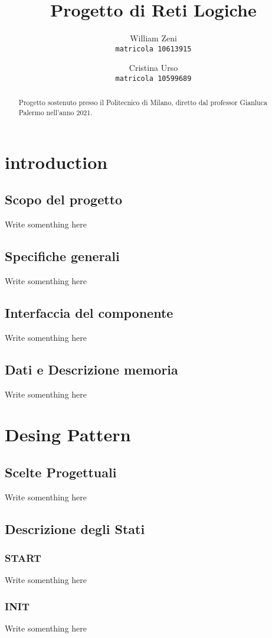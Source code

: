 \documentclass{article}
\title{Progetto di Reti Logiche}
\author{
  William Zeni\\
  \texttt{matricola 10613915}
  \and
  Cristina Urso\\
  \texttt{matricola 10599689}
}
\begin{document}
\maketitle

\begin{abstract}
  \centering
  Progetto sostenuto presso il Politecnico di Milano, diretto dal professor Gianluca Palermo nell'anno 2021.
\end{abstract}

\section{introduction}
\subsection{Scopo del progetto}
Write somenthing here

\subsection{Specifiche generali}
Write somenthing here

\subsection{Interfaccia del componente}
Write somenthing here

\subsection{Dati e Descrizione memoria}
Write somenthing here

\section{Desing Pattern}
\subsection{Scelte Progettuali}
Write somenthing here

\subsection{Descrizione degli Stati}
\subsubsection{START}
Write somenthing here

\subsubsection{INIT}
Write somenthing here
\end{document}

